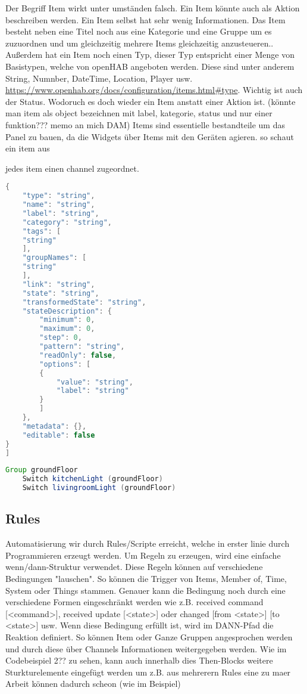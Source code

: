 Der Begriff Item wirkt unter umständen falsch. Ein Item könnte auch als Aktion beschreiben werden. Ein Item selbst hat sehr wenig Informationen. Das Item besteht neben eine Titel noch aus eine Kategorie und eine Gruppe um es zuzuordnen und um gleichzeitig mehrere Items gleichzeitig anzusteueren.. Außerdem hat ein Item noch einen Typ, dieser Typ entspricht einer Menge von Basistypen, welche von openHAB angeboten werden. Diese sind unter anderem String, Numnber, DateTime, Location, Player usw. \url{https://www.openhab.org/docs/configuration/items.html#type}.
Wichtig ist auch der Status. Wodoruch es doch wieder ein Item anstatt einer Aktion ist. (könnte man item als object bezeichnen mit label, kategorie, status und nur einer funktion??? memo an mich DAM)
Items sind essentielle bestandteile um das Panel zu bauen, da die Widgets über Items mit den Geräten agieren.
so schaut ein item aus  

jedes item einen channel zugeordnet. 
\begin{lstlisting}[language=java,firstnumber=1,caption=Item Beispiel,label=lst:sample-item]
{
	"type": "string",
	"name": "string",
	"label": "string",
	"category": "string",
	"tags": [
	"string"
	],
	"groupNames": [
	"string"
	],
	"link": "string",
	"state": "string",
	"transformedState": "string",
	"stateDescription": {
		"minimum": 0,
		"maximum": 0,
		"step": 0,
		"pattern": "string",
		"readOnly": false,
		"options": [
		{
			"value": "string",
			"label": "string"
		}
		]
	},
	"metadata": {},
	"editable": false
}
]
\end{lstlisting}

\begin{lstlisting}[language=java,firstnumber=1,caption=Item-Gruppierung Beispiel,label=lst:group-items]
	Group groundFloor
	Switch kitchenLight (groundFloor)
	Switch livingroomLight (groundFloor)
\end{lstlisting}

\subsection{Rules}
Automatisierung wir durch Rules/Scripte erreicht, welche in erster linie durch Programmieren erzeugt werden. Um Regeln zu erzeugen, wird eine einfache wenn/dann-Struktur verwendet. Diese Regeln können auf verschiedene Bedingungen "lauschen". So können die Trigger von Items, Member of, Time, System oder Things stammen. Genauer kann die Bedingung noch durch eine verschiedene Formen eingeschränkt werden wie z.B. received command [<command>],  received update [<state>] oder changed [from <state>] [to <state>] usw.
Wenn diese Bedingung erfüllt ist, wird im DANN-Pfad die Reaktion definiert. So können Item oder Ganze Gruppen angesprochen werden und durch diese über Channels Informationen weitergegeben werden.
Wie im Codebeispiel 2?? zu sehen, kann auch innerhalb dies Then-Blocks weitere Sturkturelemente eingefügt werden um z.B. aus mehrerern Rules eine zu maer Arbeit können dadurch scheon (wie im Beispiel)

